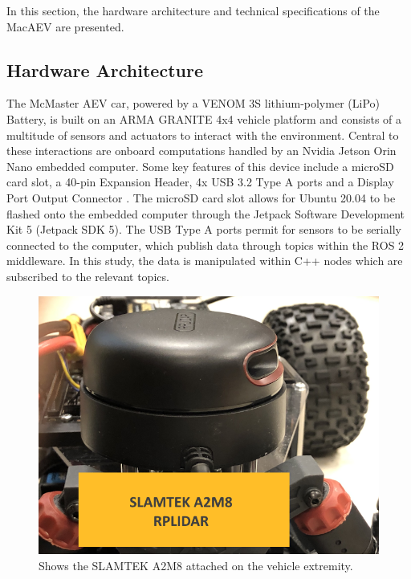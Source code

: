 \documentclass[conference]{IEEEtran}
\begin{document}

In this section, the hardware architecture and technical specifications of the MacAEV are presented.

\subsection{Hardware Architecture}

The McMaster AEV car, powered by a VENOM 3S lithium-polymer (LiPo) Battery, is built on an ARMA GRANITE 4x4 vehicle platform and consists of a multitude of sensors and actuators to interact with the environment. Central to these interactions are onboard computations handled by an Nvidia Jetson Orin Nano embedded computer. Some key features of this device include a microSD card slot, a 40-pin Expansion Header, 4x USB 3.2 Type A ports and a Display Port Output Connector \cite{b5}. The microSD card slot allows for Ubuntu 20.04 to be flashed onto the embedded computer through the Jetpack Software Development Kit 5 (Jetpack SDK 5). The USB Type A ports permit for sensors to be serially connected to the computer, which publish data through topics within the ROS 2 middleware. In this study, the data is manipulated within C++ nodes which are subscribed to the relevant topics. 

\begin{figure}
    \centering
    \includegraphics[scale=0.2]{lidar_diagram.png}
    \caption{Shows the SLAMTEK A2M8 attached on the vehicle extremity.}
    \label{Figure 2}
\end{figure}
\end{document}
